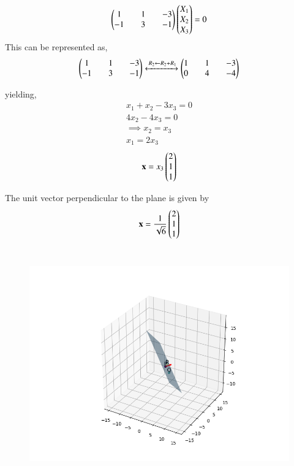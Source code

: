 \documentclass[journal]{IEEEtran}
\begin{document}
\begin{align}
    \begin{pmatrix}1&&1&&-3\\-1&&3&&-1\end{pmatrix}\begin{pmatrix}X_1\\X_2\\X_3\end{pmatrix}=0
\end{align}
This can be represented as,
\begin{align}
    \begin{pmatrix}1&&1&&-3\\-1&&3&&-1\end{pmatrix}
    \xleftrightarrow{\,R_2 \gets R_2+R_1}
    \begin{pmatrix}1&&1&&-3\\0&&4&&-4\end{pmatrix}
\end{align}

yielding,
\begin{align}
    x_1+x_2-3x_3=0\\
    4x_2-4x_3=0 \\
    \implies x_2=x_3 \\
    x_1 = 2x_3
\end{align}
\begin{align}
    \mathbf{x}=x_3\begin{pmatrix}2\\1\\1\end{pmatrix}
\end{align}

The unit vector perpendicular to the plane is given by \\
\begin{align}
     \mathbf{x}=\frac{1}{\sqrt{6}}\begin{pmatrix}2\\1\\1\end{pmatrix}
\end{align}
\\

\begin{figure}[H]
    \centering
    \includegraphics[width=0.8\columnwidth]{figs/fig.png}
    \label{fig-1}
\end{figure}

 
\end{document}
